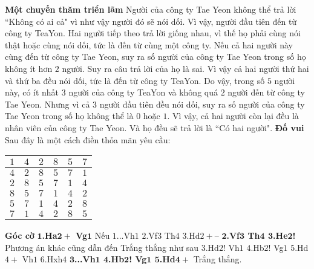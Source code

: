 \begin{multicols}{2}
	\textbf{\color{doisongtoanhoc}Một chuyến thăm triển lãm}
	\vskip 0.1cm
	Người của công ty Tae Yeon không thể trả lời ``Không có ai cả" vì như vậy người đó sẽ nói dối. Vì vậy, người đầu tiên đến từ công ty TeaYon.
	\vskip 0.1cm
	Hai người tiếp theo trả lời giống nhau, vì thế họ phải cùng nói thật hoặc cùng nói dối, tức là đến từ cùng một công ty.
	\vskip 0.1cm
	Nếu cả hai người này cùng đến từ công ty Tae Yeon, suy ra số người của công ty Tae Yeon trong số họ không ít hơn $2$ người. Suy ra câu trả lời của họ là sai. Vì vậy cả hai người thứ hai và thứ ba đều nói dối, tức là đến từ công ty TeaYon.
	\vskip 0.1cm
	Do vậy, trong số $5$ người này, có ít nhất $3$ người của công ty TeaYon và không quá $2$ người đến từ công ty Tae Yeon.
	\vskip 0.1cm
	Nhưng vì cả $3$ người đầu tiên đều nói dối, suy ra số người của công ty Tae Yeon trong số họ không thể là $0$ hoặc $1$. Vì vậy, cả hai người còn lại đều là nhân viên của công ty Tae Yeon. Và họ đều sẽ trả lời là ``Có hai người".
	\vskip 0.1cm
	\textbf{\color{doisongtoanhoc}Đố vui}
	\vskip 0.1cm
	Sau đây là một cách điền thỏa mãn yêu cầu:
	\begin{table}[H]
		\vspace*{-5pt}
		\centering
		\captionsetup{labelformat= empty, justification=centering}
		\setlength{\tabcolsep}{8pt}
		\renewcommand{\arraystretch}{1.2}
		\begin{tabular}{|c|c|c|c|c|c|}
			\hline
			$1$&$4$&$2$&$8$&$5$&$7$\\
			\hline
			$4$&$2$&$8$&$5$&$7$&$1$\\
			\hline
			$2$&$8$&$5$&$7$&$1$&$4$\\
			\hline
			$8$&$5$&$7$&$1$&$4$&$2$\\
			\hline
			$5$&$7$&$1$&$4$&$2$&$8$\\
			\hline
			$7$&$1$&$4$&$2$&$8$&$5$\\
			\hline
		\end{tabular}
		\vspace*{-10pt}
	\end{table}
	\textbf{\color{doisongtoanhoc}Góc cờ}
	\vskip 0.1cm
	$\pmb{1}$\textbf{\color{doisongtoanhoc}.Ha$\pmb{2+}$ Vg}$\pmb{1}$ Nếu $1$...Vh$1$ $2$.Vf$3$ Th$4$ $3$.Hd$2+–$
	\vskip 0.1cm
	$\pmb{2}$\textbf{\color{doisongtoanhoc}.Vf$\pmb{3}$ Th$\pmb{4}$ $\pmb{3}$.He$\pmb{2}$!} Phương án khác cũng dẫn đến Trắng thắng như sau $3$.Hd$2$! Vh$1$ $4$.Hb$2$! Vg$1$ $5$.Hd$4+$ Vh$1$ $6$.Hxh$4$
	\vskip 0.1cm
	$\pmb{3}$\textbf{\color{doisongtoanhoc}...Vh$\pmb{1}$ $\pmb{4}$.Hb$\pmb{2}$! Vg$\pmb{1}$ $\pmb{5}$.Hd}$\pmb{4+}$ Trắng thắng.
\end{multicols}
